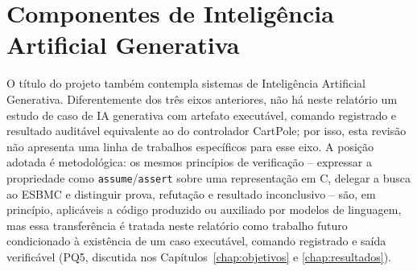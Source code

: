 \section{Componentes de Inteligência Artificial Generativa}
O título do projeto também contempla sistemas de Inteligência Artificial
Generativa. Diferentemente dos três eixos anteriores, não há neste
relatório um estudo de caso de IA generativa com artefato executável,
comando registrado e resultado auditável equivalente ao do controlador
CartPole; por isso, esta revisão não apresenta uma linha de trabalhos
específicos para esse eixo. A posição adotada é metodológica: os mesmos
princípios de verificação -- expressar a propriedade como
\texttt{assume}/\texttt{assert} sobre uma representação em C, delegar a
busca ao ESBMC e distinguir prova, refutação e resultado inconclusivo --
são, em princípio, aplicáveis a código produzido ou auxiliado por modelos
de linguagem, mas essa transferência é tratada neste relatório como trabalho futuro
condicionado à existência de um caso executável, comando registrado e
saída verificável (PQ5, discutida nos Capítulos~\ref{chap:objetivos} e
\ref{chap:resultados}).
